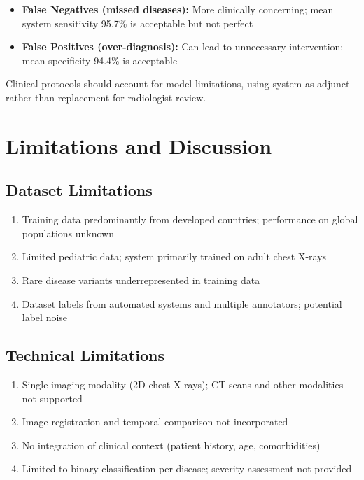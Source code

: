 {\begin{itemize}
    \item \textbf{False Negatives (missed diseases):} More clinically concerning; mean system sensitivity 95.7\% is acceptable but not perfect
    \item \textbf{False Positives (over-diagnosis):} Can lead to unnecessary intervention; mean specificity 94.4\% is acceptable
\end{itemize}

Clinical protocols should account for model limitations, using system as adjunct rather than replacement for radiologist review.

\section{Limitations and Discussion}

\subsection{Dataset Limitations}

\begin{enumerate}
    \item Training data predominantly from developed countries; performance on global populations unknown
    \item Limited pediatric data; system primarily trained on adult chest X-rays
    \item Rare disease variants underrepresented in training data
    \item Dataset labels from automated systems and multiple annotators; potential label noise
\end{enumerate}

\subsection{Technical Limitations}

\begin{enumerate}
    \item Single imaging modality (2D chest X-rays); CT scans and other modalities not supported
    \item Image registration and temporal comparison not incorporated
    \item No integration of clinical context (patient history, age, comorbidities)
    \item Limited to binary classification per disease; severity assessment not provided
\end{enumerate}

}
